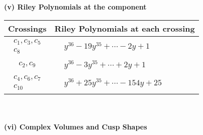 \documentclass[1p]{elsarticle_modified}
\theoremstyle{definition}
\begin{document}
\newpage\renewcommand{\arraystretch}{1}
\flushleft \textbf{(v) Riley Polynomials at the component}\newline \\
\begin{tabular}{m{50pt}|m{274pt}}
Crossings & \hspace{64pt}Riley Polynomials at each crossing \\
\hline $$\begin{aligned}c_{1},c_{3},c_{5}\\c_{8}\end{aligned}$$&$\begin{aligned}
&y^{36}-19 y^{35}+\cdots-2 y+1
\end{aligned}$\\
\hline $$\begin{aligned}c_{2},c_{9}\end{aligned}$$&$\begin{aligned}
&y^{36}-3 y^{35}+\cdots+2 y+1
\end{aligned}$\\
\hline $$\begin{aligned}c_{4},c_{6},c_{7}\\c_{10}\end{aligned}$$&$\begin{aligned}
&y^{36}+25 y^{35}+\cdots-154 y+25
\end{aligned}$\\
\hline
\end{tabular}\\~\\
\newpage\flushleft \textbf{(vi) Complex Volumes and Cusp Shapes}
\end{document}
